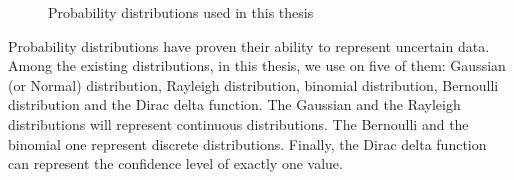 \begin{figure}
    \centering
    \hfill
    \hfill
    \hfill
    \caption{Probability distributions used in this thesis}
    \label{fig:back:proba:examples}
\end{figure}

Probability distributions have proven their ability to represent uncertain data.
Among the existing distributions, in this thesis, we use on five of them: Gaussian (or Normal) distribution, Rayleigh distribution, binomial distribution, Bernoulli distribution and the Dirac delta function.
The Gaussian and the Rayleigh distributions will represent continuous distributions.
The Bernoulli and the binomial one represent discrete distributions.
Finally, the Dirac delta function can represent the confidence level of exactly one value.

